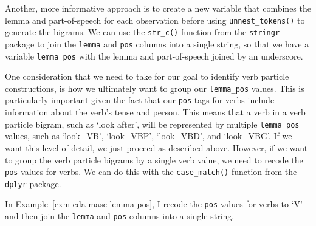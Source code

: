 \documentclass[
  letterpaper,
  DIV=11,
  numbers=noendperiod]{scrreport}
\theoremstyle{definition}
\theoremstyle{remark}
\begin{document}
Another, more informative approach is to create a new variable that
combines the lemma and part-of-speech for each observation before using
\texttt{unnest\_tokens()} to generate the bigrams. We can use the
\texttt{str\_c()} function from the \texttt{stringr} package to join the
\texttt{lemma} and \texttt{pos} columns into a single string, so that we
have a variable \texttt{lemma\_pos} with the lemma and part-of-speech
joined by an underscore.

One consideration that we need to take for our goal to identify verb
particle constructions, is how we ultimately want to group our
\texttt{lemma\_pos} values. This is particularly important given the
fact that our \texttt{pos} tags for verbs include information about the
verb's tense and person. This means that a verb in a verb particle
bigram, such as `look after', will be represented by multiple
\texttt{lemma\_pos} values, such as `look\_VB', `look\_VBP',
`look\_VBD', and `look\_VBG'. If we want this level of detail, we just
proceed as described above. However, if we want to group the verb
particle bigrams by a single verb value, we need to recode the
\texttt{pos} values for verbs. We can do this with the
\texttt{case\_match()} function from the \texttt{dplyr} package.

In Example~\ref{exm-eda-masc-lemma-pos}, I recode the \texttt{pos}
values for verbs to `V' and then join the \texttt{lemma} and
\texttt{pos} columns into a single string.
\end{document}
